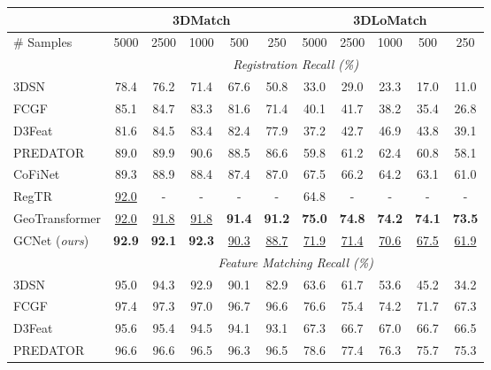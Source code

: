 \documentclass[10pt,twocolumn,letterpaper]{article}
\begin{document}
\begin{table}[b!]
\setlength{\tabcolsep}{2pt}
\centering\scriptsize
\vspace{-2.5em}
\begin{tabular}{lccccc|ccccc}
\toprule
& \multicolumn{5}{c}{3DMatch} & \multicolumn{5}{c}{3DLoMatch} \\
\midrule
\# Samples  & 5000 & 2500 & 1000 & 500 & 250 & 5000 & 2500 & 1000 & 500 & 250 \\
\midrule
& \multicolumn{10}{c}{{\it Registration Recall (\%)} } \\
\hline
3DSN\cite{gojcic2019perfect} & 78.4 & 76.2 & 71.4 & 67.6 & 50.8 & 33.0 & 29.0 & 23.3 & 17.0 & 11.0 \\
FCGF\cite{choy2019fully} & 85.1 & 84.7 & 83.3 & 81.6 & 71.4 & 40.1 & 41.7 & 38.2 & 35.4 & 26.8 \\
D3Feat\cite{bai2020d3feat} & 81.6 & 84.5 & 83.4 & 82.4 & 77.9 & 37.2 & 42.7 & 46.9 & 43.8 & 39.1 \\
PREDATOR\cite{huang2021predator} & 89.0 & 89.9 & 90.6 & 88.5 & 86.6 & 59.8 & 61.2 & 62.4 & 60.8 & 58.1 \\
CoFiNet\cite{yu2021cofinet} & 89.3 & 88.9 & 88.4 & 87.4 & 87.0 & 67.5 & 66.2 & 64.2 & 63.1 & 61.0 \\
RegTR\cite{yew2022regtr} & \underline{92.0} & - & - & - & - & 64.8 & - & - & - & - \\
GeoTransformer\cite{qin2022geometric} & \underline{92.0} & \underline{91.8} & \underline{91.8} & \textbf{91.4} & \textbf{91.2} & \textbf{75.0} & \textbf{74.8} & \textbf{74.2} & \textbf{74.1} & \textbf{73.5} \\
GCNet ({\em ours}) & \textbf{92.9} & \textbf{92.1} & \textbf{92.3} & \underline{90.3} & \underline{88.7} & \underline{71.9} & \underline{71.4} & \underline{70.6} & \underline{67.5} & \underline{61.9} \\
\midrule
& \multicolumn{10}{c}{{\it Feature Matching Recall (\%)} } \\
\midrule
3DSN\cite{gojcic2019perfect} & 95.0 & 94.3 & 92.9 & 90.1 & 82.9 & 63.6 & 61.7 & 53.6 & 45.2 & 34.2 \\
FCGF\cite{choy2019fully} & 97.4 & 97.3 & 97.0 & 96.7 & 96.6 & 76.6 & 75.4 & 74.2 & 71.7 & 67.3 \\
D3Feat\cite{bai2020d3feat} & 95.6 & 95.4 & 94.5 & 94.1 & 93.1 & 67.3 & 66.7 & 67.0 & 66.7 & 66.5 \\
PREDATOR\cite{huang2021predator} & 96.6 & 96.6 & 96.5 & 96.3 & 96.5 & 78.6 & 77.4 & 76.3 & 75.7 & 75.3 \\

\end{tabular}
\end{table}
\end{document}
